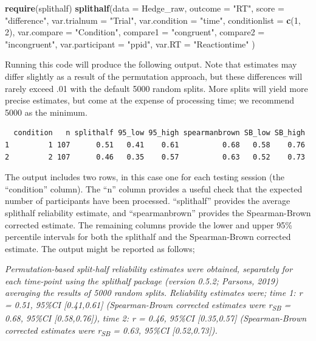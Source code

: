 \documentclass[english,,man,floatsintext]{apa6}
\newenvironment{Shaded}{\begin{snugshade}}{\end{snugshade}}
\newcommand{\DataTypeTok}[1]{\textcolor[rgb]{0.13,0.29,0.53}{#1}}
\newcommand{\DecValTok}[1]{\textcolor[rgb]{0.00,0.00,0.81}{#1}}
\newcommand{\KeywordTok}[1]{\textcolor[rgb]{0.13,0.29,0.53}{\textbf{#1}}}
\newcommand{\NormalTok}[1]{#1}
\newcommand{\StringTok}[1]{\textcolor[rgb]{0.31,0.60,0.02}{#1}}
\begin{document}
\begin{Shaded}
\begin{Highlighting}[]
\KeywordTok{require}\NormalTok{(splithalf)}
\KeywordTok{splithalf}\NormalTok{(}\DataTypeTok{data =}\NormalTok{ Hedge_raw,}
          \DataTypeTok{outcome =} \StringTok{"RT"}\NormalTok{,}
          \DataTypeTok{score =} \StringTok{"difference"}\NormalTok{,}
          \DataTypeTok{var.trialnum =} \StringTok{"Trial"}\NormalTok{,}
          \DataTypeTok{var.condition =} \StringTok{"time"}\NormalTok{,}
          \DataTypeTok{conditionlist =} \KeywordTok{c}\NormalTok{(}\DecValTok{1}\NormalTok{, }\DecValTok{2}\NormalTok{),}
          \DataTypeTok{var.compare =} \StringTok{"Condition"}\NormalTok{,}
          \DataTypeTok{compare1 =} \StringTok{"congruent"}\NormalTok{,}
          \DataTypeTok{compare2 =} \StringTok{"incongruent"}\NormalTok{,}
          \DataTypeTok{var.participant =} \StringTok{"ppid"}\NormalTok{,}
          \DataTypeTok{var.RT =} \StringTok{"Reactiontime"}\NormalTok{ )}
\end{Highlighting}
\end{Shaded}

Running this code will produce the following output. Note that estimates may differ slightly as a result of the permutation approach, but these differences will rarely exceed .01 with the default 5000 random splits. More splits will yield more precise estimates, but come at the expense of processing time; we recommend 5000 as the minimum.

\begin{verbatim}
  condition   n splithalf 95_low 95_high spearmanbrown SB_low SB_high
1         1 107      0.51   0.41    0.61          0.68   0.58    0.76
2         2 107      0.46   0.35    0.57          0.63   0.52    0.73
\end{verbatim}

The output includes two rows, in this case one for each testing session (the \enquote{condition} column). The \enquote{n} column provides a useful check that the expected number of participants have been processed. \enquote{splithalf} provides the average splithalf reliability estimate, and \enquote{spearmanbrown} provides the Spearman-Brown corrected estimate. The remaining columns provide the lower and upper 95\% percentile intervals for both the splithalf and the Spearman-Brown corrected estimate. The output might be reported as follows;

\emph{Permutation-based split-half reliability estimates were obtained, separately for each time-point using the splithalf package (version 0.5.2; Parsons, 2019) averaging the results of 5000 random splits. Reliability estimates were; time 1: r = 0.51, 95\%CI {[}0.41,0.61{]} (Spearman-Brown corrected estimates were r\textsubscript{SB} = 0.68, 95\%CI {[}0.58,0.76{]}), time 2: r = 0.46, 95\%CI {[}0.35,0.57{]} (Spearman-Brown corrected estimates were r\textsubscript{SB} = 0.63, 95\%CI {[}0.52,0.73{]}).}
\end{document}
